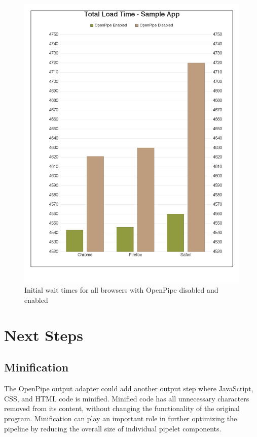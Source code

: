 \documentclass[12pt]{report}
\begin{document}
\begin{figure}[H]
\caption{Initial wait times for all browsers with OpenPipe disabled and enabled}
\label{fig:initialWaitTimesChart}
\centering
\includegraphics[width=\textwidth,keepaspectratio]{figures/images/total_load_time__sample_app_1.pdf}
\end{figure}



\chapter{Next Steps}

\section{Minification}
The OpenPipe output adapter could add another output step where JavaScript, CSS, and HTML code is minified. Minified code has all unnecessary characters removed from its content, without changing the functionality of the original program. Minification can play an important role in further optimizing the pipeline by reducing the overall size of individual pipelet components.
\end{document}
